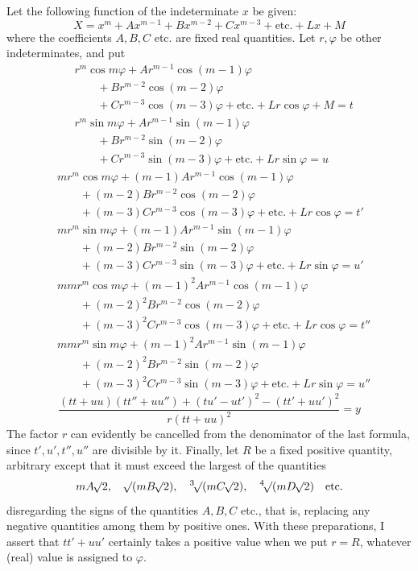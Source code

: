 Let the following function of the indeterminate $x$ be given:
\[
X=x^m+Ax^{m-1}+Bx^{m-2}+Cx^{m-3}+\text{etc.}+Lx+M
\]
where the coefficients $A,B,C$ etc. are fixed real quantities. Let $r,\varphi$ be other indeterminates, and put
\[
\begin{aligned}
&r^m\cos m\varphi+Ar^{m-1}\cos(m-1)\varphi\\
&\qquad+Br^{m-2}\cos(m-2)\varphi\\
&\qquad+Cr^{m-3}\cos(m-3)\varphi+\text{etc.}+Lr\cos\varphi+M=t\\
&r^m\sin m\varphi+Ar^{m-1}\sin(m-1)\varphi\\
&\qquad+Br^{m-2}\sin(m-2)\varphi\\
&\qquad+Cr^{m-3}\sin(m-3)\varphi+\text{etc.}+Lr\sin\varphi=u
\end{aligned}
\]
\[
\begin{aligned}
&mr^m\cos m\varphi+(m-1)Ar^{m-1}\cos(m-1)\varphi\\
&\qquad+(m-2)Br^{m-2}\cos(m-2)\varphi\\
&\qquad+(m-3)Cr^{m-3}\cos(m-3)\varphi+\text{etc.}+Lr\cos\varphi=t'\\
&mr^m\sin m\varphi+(m-1)Ar^{m-1}\sin(m-1)\varphi\\
&\qquad+(m-2)Br^{m-2}\sin(m-2)\varphi\\
&\qquad+(m-3)Cr^{m-3}\sin(m-3)\varphi+\text{etc.}+Lr\sin\varphi=u'\\[6pt]
&mmr^m\cos m\varphi+(m-1)^2Ar^{m-1}\cos(m-1)\varphi\\
&\qquad+(m-2)^2Br^{m-2}\cos(m-2)\varphi\\
&\qquad+(m-3)^2Cr^{m-3}\cos(m-3)\varphi+\text{etc.}+Lr\cos\varphi=t''\\
&mmr^m\sin m\varphi+(m-1)^2Ar^{m-1}\sin(m-1)\varphi\\
&\qquad+(m-2)^2Br^{m-2}\sin(m-2)\varphi\\
&\qquad+(m-3)^2Cr^{m-3}\sin(m-3)\varphi+\text{etc.}+Lr\sin\varphi=u''
\end{aligned}
\]
\[
\frac{(tt+uu)(tt''+uu'')+(tu'-ut')^2-(tt'+uu')^2}{r(tt+uu)^2}=y
\]
The factor $r$ can evidently be cancelled from the denominator of the last formula, since $t',u',t'',u''$ are divisible by it. Finally, let $R$ be a fixed positive quantity, arbitrary except that it must exceed the largest of the quantities
\[
mA\BareRoot{2},\quad\BareRoot{(mB\BareRoot{2})},\quad\BareRoot[3]{(mC\BareRoot{2})},\quad\BareRoot[4]{(mD\BareRoot{2})}\quad\text{etc.}
\]
disregarding the signs of the quantities $A,B,C$ etc., that is, replacing any negative quantities among them by positive ones. With these preparations, I assert that $tt'+uu'$ certainly takes a positive value when we put $r=R$, whatever (real) value is assigned to $\varphi$.

